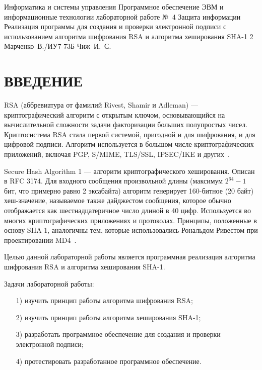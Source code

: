 \documentclass{bmstu}
\begin{document}
\makereporttitle
    {Информатика и системы управления}
    {Программное обеспечение ЭВМ и информационные технологии}
    {лабораторной работе №~4} %
    {Защита информации} %
    {Реализация программы для создания и проверки электронной подписи с использованием алгоритма шифрования RSA и алгоритма хеширования SHA-1} %
    {2}
    {Марченко~В./ИУ7-73Б} %
    {Чиж~И.~С.} %

{\centering \maketableofcontents}

{\centering \chapter*{ВВЕДЕНИЕ}}

RSA (аббревиатура от фамилий Rivest, Shamir и Adleman) --- криптографический алгоритм с открытым ключом, основывающийся на вычислительной сложности задачи факторизации больших полупростых чисел. 
Криптосистема RSA стала первой системой, пригодной и для шифрования, и для цифровой подписи. 
Алгоритм используется в большом числе криптографических приложений, включая PGP, S/MIME, TLS/SSL, IPSEC/IKE и других~\cite{wiki-rsa}.

Secure Hash Algorithm 1 --- алгоритм криптографического хеширования. 
Описан в RFC 3174. 
Для входного сообщения произвольной длины (максимум $2^{64} - 1$ бит, что примерно равно 2 эксабайта) алгоритм генерирует 160-битное (20 байт) хеш-значение, называемое также дайджестом сообщения, которое обычно отображается как шестнадцатеричное число длиной в 40 цифр. 
Используется во многих криптографических приложениях и протоколах. 
Принципы, положенные в основу SHA-1, аналогичны тем, которые использовались Рональдом Ривестом при проектировании MD4~\cite{wiki-sha}.

Целью данной лабораторной работы является программная реализация алгоритма шифрования RSA и алгоритма хеширования SHA-1.

Задачи лабораторной работы:
\begin{enumerate}
\item[1)] изучить принцип работы алгоритма шифрования RSA;
\item[2)] изучить принцип работы алгоритма хеширования SHA-1;
\item[3)] разработать программное обеспечение для создания и проверки электронной подписи;
\item[4)] протестировать разработанное программное обеспечение.
\end{enumerate}
\end{document}
